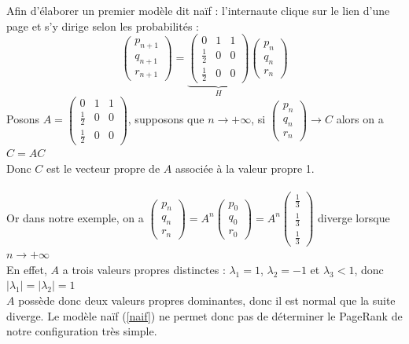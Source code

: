 \documentclass[a4paper,10pt]{report}
\begin{document}
Afin d'élaborer un premier modèle dit naïf : l'internaute clique sur le lien d'une page et s'y dirige selon les probabilités :
\begin{equation}
\left( \begin{array}{c} p_{n+1} \\ q_{n+1} \\ r_{n+1} \end{array} \right)
= \underbrace{\left( \begin{array}{ccc} 0 & 1 & 1 \\ \frac{1}{2} & 0 & 0 \\ \frac{1}{2} & 0 & 0 \end{array} \right)}_H
\left( \begin{array}{c} p_{n} \\ q_{n} \\ r_{n} \end{array} \right)
\label{naif}
\end{equation}
Posons $A=\left( \begin{array}{ccc} 0 & 1 & 1 \\ \frac{1}{2} & 0 & 0 \\ \frac{1}{2} & 0 & 0 \end{array} \right)$, supposons que $n\longrightarrow +\infty$, si $\left( \begin{array}{c} p_{n} \\ q_{n} \\ r_{n} \end{array} \right)\longrightarrow C$ alors on a $C=AC$\\
Donc $C$ est le vecteur propre de $A$ associée à la valeur propre 1.\\ \\

\indent Or dans notre exemple, on a $\left( \begin{array}{c} p_{n} \\ q_{n} \\ r_{n} \end{array} \right)=A^n\left( \begin{array}{c} p_{0} \\ q_{0} \\ r_{0} \end{array} \right)=A^n\left( \begin{array}{c} \frac{1}{3} \\ \frac{1}{3} \\ \frac{1}{3} \end{array} \right)$ diverge lorsque $n\longrightarrow +\infty$\\
En effet, $A$ a trois valeurs propres distinctes : $\lambda_1=1$, $\lambda_2=-1$ et $\lambda_3<1$, donc $|\lambda_1|=|\lambda_2|=1$\\
$A$ possède donc deux valeurs propres dominantes, donc il est normal que la suite diverge. Le modèle naïf (\ref{naif}) ne permet donc pas de déterminer le PageRank de notre configuration très simple.\\ \\
\end{document}
